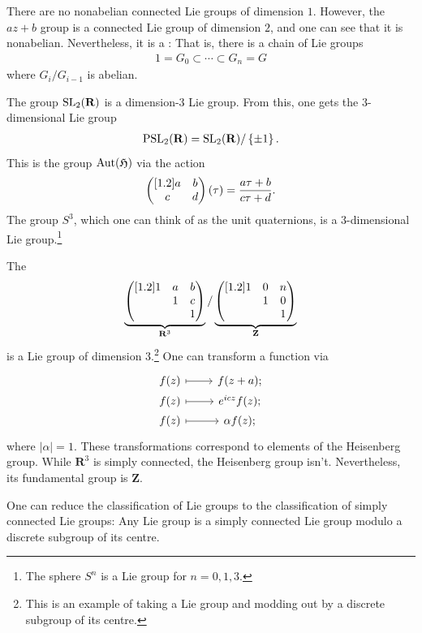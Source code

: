 \documentclass [11 pt, twoside] {article}
\begin{document}
There are no nonabelian connected Lie groups of dimension $1$. 
However, the $az+b$ group is a connected Lie group of dimension $2$, and one can see that it is nonabelian. Nevertheless, it is a : That is, there is a chain of Lie groups
\begin{align*}
	1 = G_0 \subset \cdots \subset G_{n} = G
\end{align*}
where $G_{i}/G_{i-1}$ is abelian.

The group $\operatorname{SL}_{2}(\mathbf{R})$ is a dimension-$3$ Lie group. From this, one gets the $3$-dimensional Lie group
\begin{align*}
	\operatorname{PSL}_{2}(\mathbf{R}) = \operatorname{SL}_{2}(\mathbf{R}) / \left\{ \pm 1 \right\}.
\end{align*}
This is the group $\operatorname{Aut}(\mathfrak{H})$ via the action
\begin{align*}
	\begin{pmatrix} [1.2] a&b\\c&d\end{pmatrix}(\tau) =  \frac{a\tau+b}{c\tau+d}.
\end{align*}
The group $S^{3}$, which one can think of as the unit quaternions, is a $3$-dimensional Lie group.\footnote{The sphere $S^{n}$ is a Lie group for $n=0,1,3$.}

The  
\begin{align*}
	\underbrace{\begin{pmatrix} [1.2] 1&a&b\\&1&c\\&&1\end{pmatrix} }_{\mathbf{R}^{3}} / \underbrace{\begin{pmatrix} [1.2] 1&0&n\\&1&0\\&&1\end{pmatrix}}_{\mathbf{Z}} 
\end{align*}
is a Lie group of dimension $3$.\footnote{This is an example of taking a Lie group and modding out by a discrete subgroup of its centre.}
One can transform a function via
\[
\begin{tikzcd}[row sep = 0 em]
	f(z) \ar[r,mapsto] & f(z+a);\\
	f (z) \ar[r,mapsto] & e ^{icz}f(z);\\
	f (z)\ar[r,mapsto] & \alpha f (z);
\end{tikzcd}
\]
where $\left\lvert \alpha \right\rvert =1$.
These transformations correspond to elements of the Heisenberg group.
While $\mathbf{R}^{3}$ is simply connected, the Heisenberg group isn't. Nevertheless, its fundamental group is $\mathbf{Z}$.

One can reduce the classification of Lie groups to the classification of simply connected Lie groups: Any Lie group is a simply connected Lie group modulo a discrete subgroup of its centre. 
\end{document}
